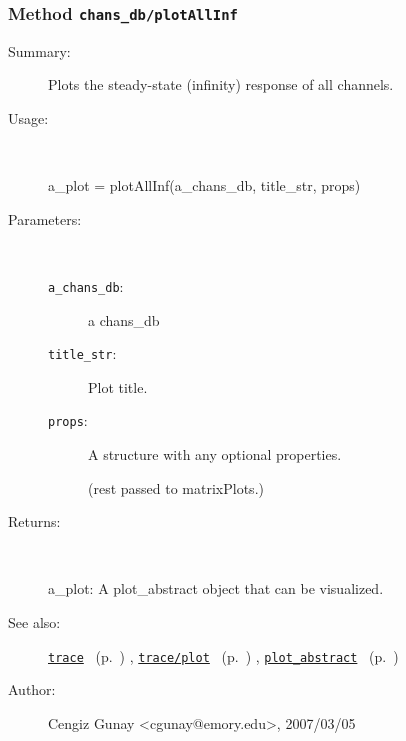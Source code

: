 \subsubsection[Method \texttt{plotAllInf}]{Method \texttt{chans\_db/plotAllInf}}%
%
\label{ref_chans_db__plotAllInf}%
\hypertarget{ref_chans_db__plotAllInf}{}%
\begin{description}
\item[Summary:]Plots the steady-state (infinity) response of all channels.
%
\item[Usage:]~%
\begin{lyxcode}%
a\_plot = plotAllInf(a\_chans\_db, title\_str, props)
%
\end{lyxcode}%
%
%
\item[Parameters:]~
\begin{description}%
\item[\texttt{a\_chans\_db}:]
 a chans\_db
\item[\texttt{title\_str}:]
 Plot title.
\item[\texttt{props}:]
 A structure with any optional properties.

(rest passed to matrixPlots.)
\end{description}%
%
\item[Returns:
]~

	a\_plot: A plot\_abstract object that can be visualized.
%
%
\item[See also:]%
\hyperlink{ref_trace}{\texttt{trace}}%
\ (p.~\pageref{ref_trace})%
%
, \hyperlink{ref_trace__plot}{\texttt{trace/plot}}%
\ (p.~\pageref{ref_trace__plot})%
%
, \hyperlink{ref_plot_abstract}{\texttt{plot\_abstract}}%
\ (p.~\pageref{ref_plot_abstract})%
%
%
\item[Author:]%
Cengiz Gunay <cgunay@emory.edu>, 2007/03/05
%
\end{description}
\methodline%
